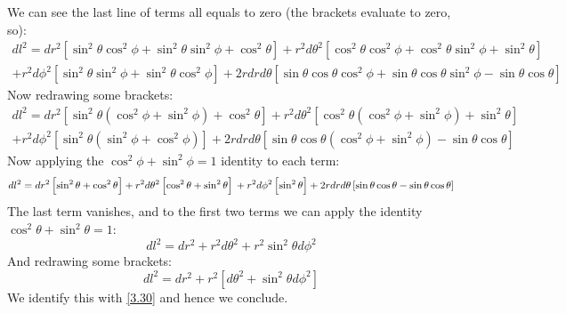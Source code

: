 We can see the last line of terms all equals to zero (the brackets evaluate to zero, so):
\begin{multline}
    dl^2 = dr^2\left[\sin^2\theta \cos^2\phi + \sin^2\theta\sin^2\phi + \cos^2\theta\right] + r^2 d\theta^2\left[\cos^2\theta\cos^2\phi + \cos^2\theta\sin^2\phi + \sin^2\theta\right]
    \\ + r^2d\phi^2 \left[\sin^2\theta\sin^2\phi + \sin^2\theta\cos^2\phi\right] + 2r drd\theta \left[\sin\theta\cos\theta\cos^2\phi + \sin\theta\cos\theta\sin^2\phi - \sin\theta\cos\theta\right]
\end{multline}
Now redrawing some brackets:
\begin{multline}
    dl^2 = dr^2\left[\sin^2\theta(\cos^2\phi + \sin^2\phi) + \cos^2\theta\right] + r^2 d\theta^2\left[\cos^2\theta(\cos^2\phi + \sin^2\phi) + \sin^2\theta\right]
    \\ + r^2d\phi^2 \left[\sin^2\theta(\sin^2\phi + \cos^2\phi)\right] + 2r drd\theta \left[\sin\theta\cos\theta(\cos^2\phi + \sin^2\phi) - \sin\theta\cos\theta\right]
\end{multline}
Now applying the $\cos^2\phi + \sin^2\phi = 1$ identity to each term:
\begin{equation}
    dl^2 = dr^2\left[\sin^2\theta + \cos^2\theta\right] + r^2 d\theta^2\left[\cos^2\theta + \sin^2\theta\right]
    \\ + r^2d\phi^2 \left[\sin^2\theta \right] + 2r drd\theta \left[\sin\theta\cos\theta - \sin\theta\cos\theta\right]
\end{equation}
The last term vanishes, and to the first two terms we can apply the identity $\cos^2\theta + \sin^2\theta = 1$:
\begin{equation}
    dl^2 = dr^2 + r^2d\theta^2 + r^2\sin^2\theta d\phi^2
\end{equation}
And redrawing some brackets:
\begin{equation}
    dl^2 = dr^2 + r^2\left[d\theta^2 + \sin^2\theta d\phi^2\right]
\end{equation}
We identify this with \eqref{3.30} and hence we conclude.